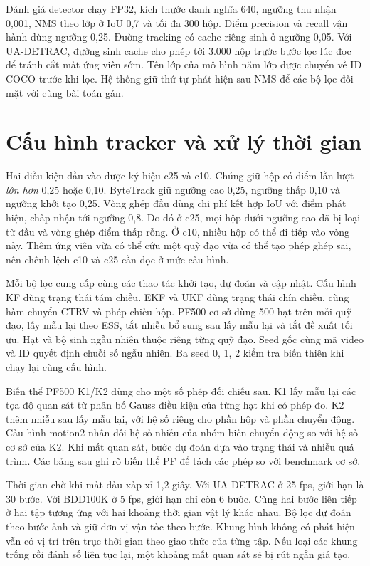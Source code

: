 Đánh giá detector chạy FP32, kích thước danh nghĩa 640, ngưỡng thu nhận 0,001, NMS theo lớp ở IoU 0,7 và tối đa 300 hộp. Điểm precision và recall vận hành dùng ngưỡng 0,25. Đường tracking có cache riêng sinh ở ngưỡng 0,05. Với UA-DETRAC, đường sinh cache cho phép tới 3.000 hộp trước bước lọc lúc đọc để tránh cắt mất ứng viên sớm. Tên lớp của mô hình năm lớp được chuyển về ID COCO trước khi lọc. Hệ thống giữ thứ tự phát hiện sau NMS để các bộ lọc đối mặt với cùng bài toán gán.

\section{Cấu hình tracker và xử lý thời gian}
Hai điều kiện đầu vào được ký hiệu c25 và c10. Chúng giữ hộp có điểm lần lượt \emph{lớn hơn} 0,25 hoặc 0,10. ByteTrack giữ ngưỡng cao 0,25, ngưỡng thấp 0,10 và ngưỡng khởi tạo 0,25. Vòng ghép đầu dùng chi phí kết hợp IoU với điểm phát hiện, chấp nhận tới ngưỡng 0,8. Do đó ở c25, mọi hộp dưới ngưỡng cao đã bị loại từ đầu và vòng ghép điểm thấp rỗng. Ở c10, nhiều hộp có thể đi tiếp vào vòng này. Thêm ứng viên vừa có thể cứu một quỹ đạo vừa có thể tạo phép ghép sai, nên chênh lệch c10 và c25 cần đọc ở mức cấu hình.

Mỗi bộ lọc cung cấp cùng các thao tác khởi tạo, dự đoán và cập nhật. Cấu hình KF dùng trạng thái tám chiều. EKF và UKF dùng trạng thái chín chiều, cùng hàm chuyển CTRV và phép chiếu hộp. PF500 cơ sở dùng 500 hạt trên mỗi quỹ đạo, lấy mẫu lại theo ESS, tắt nhiễu bổ sung sau lấy mẫu lại và tắt đề xuất tối ưu. Hạt và bộ sinh ngẫu nhiên thuộc riêng từng quỹ đạo. Seed gốc cùng mã video và ID quyết định chuỗi số ngẫu nhiên. Ba seed 0, 1, 2 kiểm tra biến thiên khi chạy lại cùng cấu hình.

Biến thể PF500 K1/K2 dùng cho một số phép đối chiếu sau. K1 lấy mẫu lại các tọa độ quan sát từ phân bố Gauss điều kiện của từng hạt khi có phép đo. K2 thêm nhiễu sau lấy mẫu lại, với hệ số riêng cho phần hộp và phần chuyển động. Cấu hình motion2 nhân đôi hệ số nhiễu của nhóm biến chuyển động so với hệ số cơ sở của K2. Khi mất quan sát, bước dự đoán dựa vào trạng thái và nhiễu quá trình. Các bảng sau ghi rõ biến thể PF để tách các phép so với benchmark cơ sở.

Thời gian chờ khi mất dấu xấp xỉ 1,2 giây. Với UA-DETRAC ở 25 fps, giới hạn là 30 bước. Với BDD100K ở 5 fps, giới hạn chỉ còn 6 bước. Cùng hai bước liên tiếp ở hai tập tương ứng với hai khoảng thời gian vật lý khác nhau. Bộ lọc dự đoán theo bước ảnh và giữ đơn vị vận tốc theo bước. Khung hình không có phát hiện vẫn có vị trí trên trục thời gian theo giao thức của từng tập. Nếu loại các khung trống rồi đánh số liên tục lại, một khoảng mất quan sát sẽ bị rút ngắn giả tạo.

